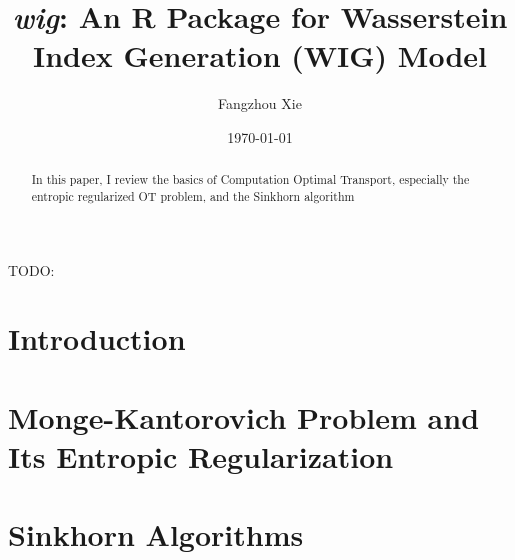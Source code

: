 \documentclass[oneside,12pt,letterpaper]{article}
\title{\textit{\textbf{wig}}: An R Package for Wasserstein Index Generation (WIG) Model}
\author{Fangzhou Xie}
\affil{Department of Economics, Rutgers University}
\date{\today}
\begin{document}
\maketitle



\begin{abstract}
  In this paper, I review the basics of Computation Optimal Transport, especially the entropic regularized OT problem,
  and the Sinkhorn algorithm
\end{abstract}

TODO: {
\color{red}
}


\newpage


\tableofcontents
\newpage


\section{Introduction}





\section{Monge-Kantorovich Problem and Its Entropic Regularization}\label{sec:review}



\section{Sinkhorn Algorithms}\label{sec:sinkhorn-algorithm}

\end{document}
